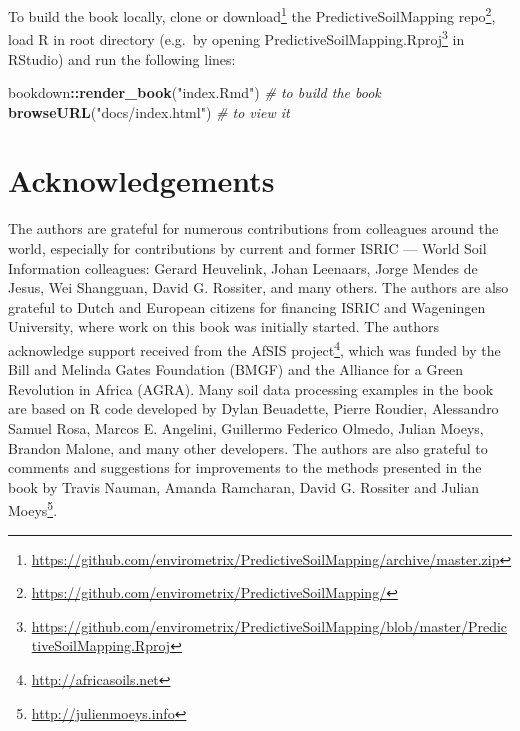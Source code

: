 \documentclass[graybox,natbib,nospthms,UStrade]{svmono}
\newenvironment{Shaded}{\begin{snugshade}}{\end{snugshade}}
\newcommand{\CommentTok}[1]{\textcolor[rgb]{0.37,0.37,0.37}{\textit{#1}}}
\newcommand{\KeywordTok}[1]{\textcolor[rgb]{0.27,0.27,0.27}{\textbf{#1}}}
\newcommand{\NormalTok}[1]{#1}
\newcommand{\OperatorTok}[1]{\textcolor[rgb]{0.43,0.43,0.43}{\textbf{#1}}}
\newcommand{\StringTok}[1]{\textcolor[rgb]{0.5,0.5,0.5}{#1}}
\renewcommand{\href}[2]{#2 (\url{#1})}
\renewcommand{\href}[2]{#2\footnote{\url{#1}}}
\begin{document}
To build the book locally, clone or \href{https://github.com/envirometrix/PredictiveSoilMapping/archive/master.zip}{download} the \href{https://github.com/envirometrix/PredictiveSoilMapping/}{PredictiveSoilMapping repo}, load R in root directory (e.g.~by opening \href{https://github.com/envirometrix/PredictiveSoilMapping/blob/master/PredictiveSoilMapping.Rproj}{PredictiveSoilMapping.Rproj} in RStudio) and run the following lines:

\begin{Shaded}
\begin{Highlighting}[]
\NormalTok{bookdown}\OperatorTok{::}\KeywordTok{render_book}\NormalTok{(}\StringTok{"index.Rmd"}\NormalTok{) }\CommentTok{# to build the book}
\KeywordTok{browseURL}\NormalTok{(}\StringTok{"docs/index.html"}\NormalTok{) }\CommentTok{# to view it}
\end{Highlighting}
\end{Shaded}

\hypertarget{acknowledgements}{%
\section*{Acknowledgements}\label{acknowledgements}}

The authors are grateful for numerous contributions from colleagues around the world, especially for contributions by current and former ISRIC --- World Soil Information colleagues: Gerard Heuvelink, Johan Leenaars, Jorge Mendes de Jesus, Wei Shangguan, David G. Rossiter, and many others. The authors are also grateful to Dutch and European citizens for financing ISRIC and Wageningen University, where work on this book was initially started. The authors acknowledge support received from the \href{http://africasoils.net}{AfSIS project}, which was funded by the Bill and Melinda Gates Foundation (BMGF) and the Alliance for a Green Revolution in Africa (AGRA). Many soil data processing examples in the book are based on R code developed by Dylan Beuadette, Pierre Roudier, Alessandro Samuel Rosa, Marcos E. Angelini, Guillermo Federico Olmedo, Julian Moeys, Brandon Malone, and many other developers. The authors are also grateful to comments and suggestions for improvements to the methods presented in the book by Travis Nauman, Amanda Ramcharan, David G. Rossiter and \href{http://julienmoeys.info}{Julian Moeys}.
\end{document}
